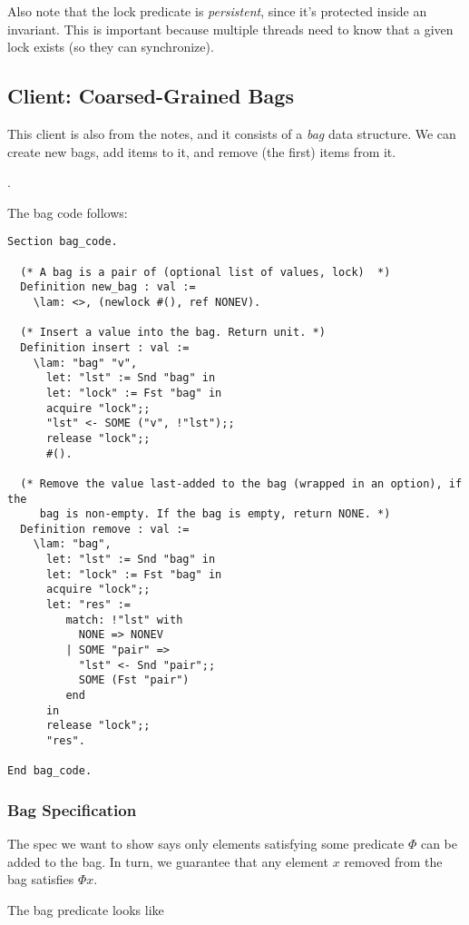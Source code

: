 Also note that the lock predicate is \emph{persistent}, since it's protected inside an invariant. This is important because multiple threads need to know that a given lock exists (so they can synchronize).

\subsection{Client: Coarsed-Grained Bags}

This client is also from the notes, and it consists of a \emph{bag} data structure. We can create new bags, add items to it, and remove (the first) items from it.

.

The bag code follows:

\begin{verbatim}
Section bag_code.

  (* A bag is a pair of (optional list of values, lock)  *)
  Definition new_bag : val :=
    \lam: <>, (newlock #(), ref NONEV).

  (* Insert a value into the bag. Return unit. *)
  Definition insert : val :=
    \lam: "bag" "v",
      let: "lst" := Snd "bag" in
      let: "lock" := Fst "bag" in
      acquire "lock";;
      "lst" <- SOME ("v", !"lst");;
      release "lock";;        
      #().        

  (* Remove the value last-added to the bag (wrapped in an option), if the
     bag is non-empty. If the bag is empty, return NONE. *)
  Definition remove : val :=
    \lam: "bag",
      let: "lst" := Snd "bag" in
      let: "lock" := Fst "bag" in
      acquire "lock";;
      let: "res" :=
         match: !"lst" with
           NONE => NONEV
         | SOME "pair" =>
           "lst" <- Snd "pair";;
           SOME (Fst "pair")
         end
      in           
      release "lock";;
      "res".        
  
End bag_code.
\end{verbatim}

\subsubsection{Bag Specification}

The spec we want to show says only elements satisfying some predicate $\Phi$ can be added to the bag. In turn, we guarantee that any element $x$ removed from the bag satisfies $\Phi x$.

The bag predicate looks like

